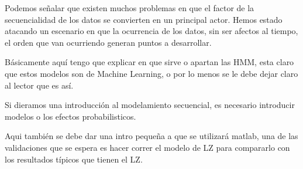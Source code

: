 

Podemos señalar que existen muchos problemas en que el factor de la secuencialidad de los datos se convierten en un principal actor. Hemos estado atacando un escenario en que la ocurrencia de los datos, sin ser afectos al tiempo, el orden que van ocurriendo generan puntos a desarrollar.

Básicamente aquí tengo que explicar en que sirve o apartan las HMM, esta claro que estos modelos son de Machine Learning, o por lo menos se le debe dejar claro al lector que es así.

Si dieramos una introducción al modelamiento secuencial, es necesario introducir modelos o los efectos probabilisticos.



Aqui también se debe dar una intro pequeña a que se utilizará matlab, una de las validaciones que se espera es hacer correr el modelo de LZ para compararlo con los resultados típicos que tienen el LZ.



